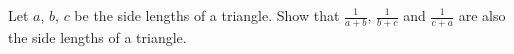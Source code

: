 Let $a$, $b$, $c$ be the side lengths of a triangle. Show that $\frac{1}{a+b}$, $\frac{1}{b+c}$ and $\frac{1}{c+a}$ are also the side lengths of a triangle.
